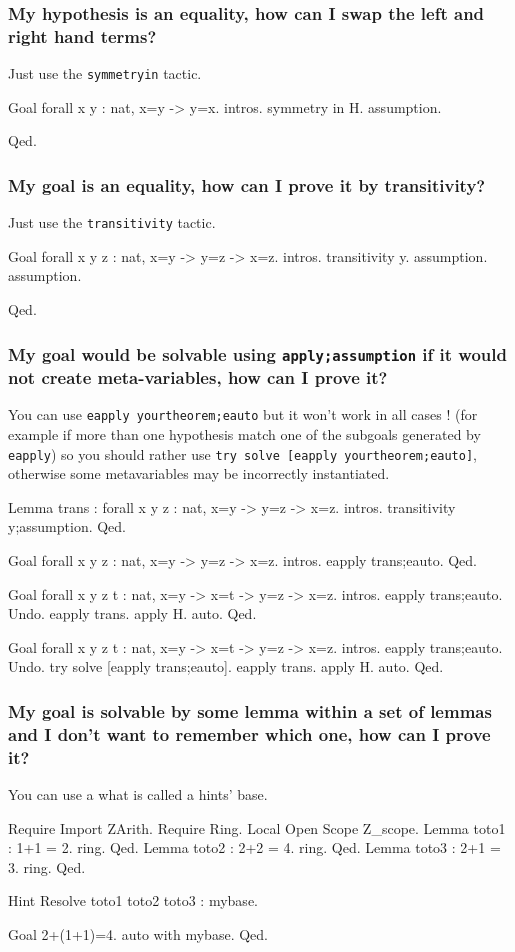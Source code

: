 \documentclass[a4paper,pdftex]{article}
\def\Question#1{\stepcounter{question}\subsubsection{#1}}
\def\eapply{{\tt eapply}}
\def\transitivity{{\tt transitivity}}
\def\symmetryin{{\tt symmetryin}}
\begin{document}
\Question{My hypothesis is an equality, how can I swap the left and right hand terms?}

Just use the {\symmetryin} tactic.

\begin{coq_example}
Goal forall x y : nat, x=y -> y=x.
intros.
symmetry in H.
assumption.
\end{coq_example}
\begin{coq_example*}
Qed.
\end{coq_example*}


\Question{My goal is an equality, how can I prove it by transitivity?}

Just use the {\transitivity} tactic.
\begin{coq_example}
Goal forall x y z : nat, x=y -> y=z -> x=z.
intros.
transitivity y.
assumption.
assumption.
\end{coq_example}
\begin{coq_example*}
Qed.
\end{coq_example*}


\Question{My goal would be solvable using {\tt apply;assumption} if it would not create meta-variables, how can I prove it?}

You can use {\tt eapply yourtheorem;eauto} but it won't work in all cases ! (for example if more than one hypothesis match one of the subgoals generated by \eapply) so you should rather use  {\tt try solve [eapply yourtheorem;eauto]}, otherwise some metavariables may be incorrectly instantiated.

\begin{coq_example}
Lemma trans : forall x y z : nat, x=y -> y=z -> x=z.
intros.
transitivity y;assumption.
Qed.

Goal forall x y z : nat, x=y -> y=z -> x=z.
intros.
eapply trans;eauto.
Qed.

Goal forall x y z t : nat, x=y -> x=t -> y=z -> x=z.
intros.
eapply trans;eauto.
Undo.
eapply trans.
apply H.
auto.
Qed.

Goal forall x y z t : nat, x=y -> x=t -> y=z -> x=z.
intros.
eapply trans;eauto.
Undo.
try solve [eapply trans;eauto].
eapply trans.
apply H.
auto.
Qed.
\end{coq_example}

\Question{My goal is solvable by  some lemma within a set of lemmas and I don't want to remember which one, how can I prove it?}

You can use a what is called a hints' base.

\begin{coq_example}
Require Import ZArith.
Require Ring.
Local Open Scope Z_scope.
Lemma toto1 : 1+1 = 2.
ring.
Qed.
Lemma toto2 : 2+2 = 4.
ring.
Qed.
Lemma toto3 : 2+1 = 3.
ring.
Qed.

Hint Resolve toto1 toto2 toto3 : mybase.

Goal 2+(1+1)=4. 
auto with mybase.
Qed.
\end{coq_example}
\end{document}

